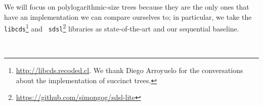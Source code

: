 We will focus on polylogarithmic-size trees because they are the only
ones that have an implementation we can compare ourselves to; in
particular, we take the {\tt
libcds}\footnote{\url{http://libcds.recoded.cl}. We thank Diego
Arroyuelo for the conversations about the implementation of succinct
trees.} and {\tt
sdsl}\footnote{\url{https://github.com/simongog/sdsl-lite}} libraries
as state-of-the-art and our sequential baseline.

\\
